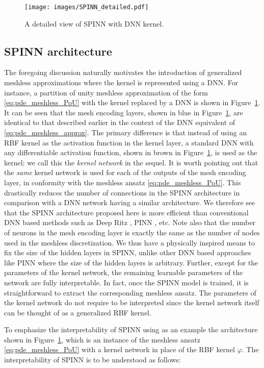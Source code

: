 \documentclass[12pt]{article}
\begin{document}
\begin{figure}
\centering
\texttt{[image: images/SPINN\_detailed.pdf]}
\caption{A detailed view of SPINN with DNN kernel.}
\label{fig:meshless_nn_detailed}
\end{figure}

\subsection{SPINN architecture}
The foregoing discussion naturally motivates the introduction of generalized meshless approximations where the kernel is represented using a DNN. For instance, a partition of unity meshless approximation of the form \eqref{eq:pde_meshless_PoU} with the kernel replaced by a DNN is shown in Figure~\ref{fig:meshless_nn_detailed}. It can be seen that the mesh encoding layers, shown in blue in Figure~\ref{fig:meshless_nn_detailed}, are identical to that described earlier in the context of the DNN equivalent of \eqref{eq:pde_meshless_approx}. The primary difference is that instead of using an RBF kernel as the activation function in the kernel layer, a standard DNN with any differentiable activation function, shown in brown in Figure~\ref{fig:meshless_nn_detailed}, is used as the kernel; we call this the \emph{kernel network} in the sequel. It is worth pointing out that the \emph{same} kernel network is used for each of the outputs of the mesh encoding layer, in conformity with the meshless ansatz \eqref{eq:pde_meshless_PoU}. This drastically reduces the number of connections in the SPINN architecture in comparison with a DNN network having a similar architecture. We therefore see that the SPINN architecture proposed here is more efficient than conventional DNN based methods such as Deep Ritz \cite{EYu2018}, PINN \cite{RPK2019}, etc. Note also that the number of neurons in the mesh encoding layer is exactly the same as the number of nodes used in the meshless discretization. We thus have a physically inspired means to fix the size of the hidden layers in SPINN, unlike other DNN based approaches like PINN where the size of the hidden layers is arbitrary.  Further, except for the parameters of the kernel network, the remaining learnable parameters of the network are fully interpretable. In fact, once the SPINN model is trained, it is straightforward to extract the corresponding meshless ansatz. The parameters of the kernel network do not require to be interpreted since the kernel network itself can be thought of as a generalized RBF kernel.

To emphasize the interpretability of SPINN using as an example the architecture shown in Figure~\ref{fig:meshless_nn_detailed}, which is an instance of the meshless ansatz \eqref{eq:pde_meshless_PoU} with a kernel network in place of the RBF kernel $\varphi$. The interpretability of SPINN is to be understood as follows:
\end{document}
